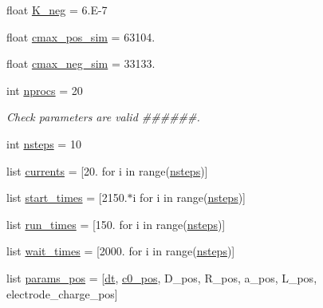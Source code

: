 \begin{DoxyCompactItemize}
float \hyperlink{namespaceuser__input__full__battery___g_i_t_t_a64d0c5854299798787675bc91586023c}{K\-\_\-neg} = 6.\-E-\/7
\item 
float \hyperlink{namespaceuser__input__full__battery___g_i_t_t_aa5b015cc7d0bda453c6163023448db72}{cmax\-\_\-pos\-\_\-sim} = 63104.
\item 
float \hyperlink{namespaceuser__input__full__battery___g_i_t_t_ab7633a5e9c70aabfe6992e4fe521a1f9}{cmax\-\_\-neg\-\_\-sim} = 33133.
\item 
int \hyperlink{namespaceuser__input__full__battery___g_i_t_t_ad7c4c17cf720ee538e27c02ab356ed6b}{nprocs} = 20
\begin{DoxyCompactList}\small\item\em Check parameters are valid \#\#\#\#\#\#. \end{DoxyCompactList}\item 
int \hyperlink{namespaceuser__input__full__battery___g_i_t_t_aa2414080b021dbb9b56eeaeedec0ffa2}{nsteps} = 10
\item 
list \hyperlink{namespaceuser__input__full__battery___g_i_t_t_a216022bdba987f127b6cc081ee78e2bd}{currents} = \mbox{[}20. for i in range(\hyperlink{namespaceuser__input__full__battery___g_i_t_t_aa2414080b021dbb9b56eeaeedec0ffa2}{nsteps})\mbox{]}
\item 
list \hyperlink{namespaceuser__input__full__battery___g_i_t_t_a377a515511d37e8c7ac5501847d6485d}{start\-\_\-times} = \mbox{[}2150.$\ast$i for i in range(\hyperlink{namespaceuser__input__full__battery___g_i_t_t_aa2414080b021dbb9b56eeaeedec0ffa2}{nsteps})\mbox{]}
\item 
list \hyperlink{namespaceuser__input__full__battery___g_i_t_t_a5a6deb885420d2b81e210e580767b1c1}{run\-\_\-times} = \mbox{[}150. for i in range(\hyperlink{namespaceuser__input__full__battery___g_i_t_t_aa2414080b021dbb9b56eeaeedec0ffa2}{nsteps})\mbox{]}
\item 
list \hyperlink{namespaceuser__input__full__battery___g_i_t_t_ae584b229c7b1ea3d8330e6038884ffd3}{wait\-\_\-times} = \mbox{[}2000. for i in range(\hyperlink{namespaceuser__input__full__battery___g_i_t_t_aa2414080b021dbb9b56eeaeedec0ffa2}{nsteps})\mbox{]}
\item 
list \hyperlink{namespaceuser__input__full__battery___g_i_t_t_a51c49f845d3932a6a084187c90aab1ab}{params\-\_\-pos} = \mbox{[}\hyperlink{namespaceuser__input__full__battery___g_i_t_t_a778e38aa889751afffa2dea6b803e67a}{dt}, \hyperlink{namespaceuser__input__full__battery___g_i_t_t_a5abfcbf596ddd1acc1de08c37cfde9c3}{c0\-\_\-pos}, D\-\_\-pos, R\-\_\-pos, a\-\_\-pos, L\-\_\-pos, electrode\-\_\-charge\-\_\-pos\mbox{]}

\end{DoxyCompactItemize}
